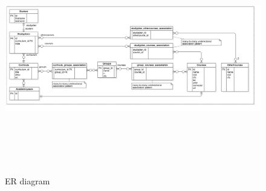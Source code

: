 \documentclass{article}
\begin{document}
\begin{figure}
  \centering
   \includegraphics[height=10cm]{img/ERD.png}
     \caption{ER diagram}
  \label{fig: Entity Relationship diagram}
\end{figure}

\newpage
\end{document}
